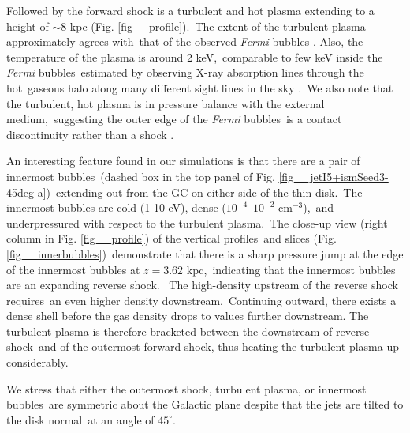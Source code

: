 \documentclass[fleqn,usenatbib,useAMS]{mnras}
\begin{document}
 Followed by the forward shock is a turbulent and hot plasma extending to a height of $\sim 8$ kpc (Fig. \ref{fig__profile}).\
 The extent of the turbulent plasma approximately agrees with\
 that of the observed \textit{Fermi} bubbles \citep{Su2010}.
 Also, the temperature of the plasma is around 2 keV,\
 comparable to few keV inside the \textit{Fermi} bubbles\
 estimated by observing X-ray absorption lines through the hot\
 gaseous halo along many different sight lines in the sky \citep{Miller_2013}.\
 We also note that the turbulent, hot plasma is in pressure balance with the external medium,\
 suggesting the outer edge of the \textit{Fermi} bubbles\
 is a contact discontinuity rather than a shock \citep{Zhang2020}.


 An interesting feature found in our simulations is that there are a pair of innermost bubbles\
 (dashed box in the top panel of Fig. \ref{fig__jetI5+ismSeed3-45deg-a})\
 extending out from the GC on either side of the thin disk.\
 The innermost bubbles are cold (1-10 eV), dense ($10^{-4}$--$10^{-2}$ cm$^{-3}$),\
 and underpressured with respect to the turbulent plasma.\
 The close-up view (right column in Fig. \ref{fig__profile}) of the vertical profiles\
 and slices (Fig. \ref{fig__innerbubbles})\
 demonstrate that there is a sharp pressure jump at the edge of the innermost bubbles at $z=3.62$ kpc,\
 indicating that the innermost bubbles are an expanding reverse shock.\ %
 The high-density upstream of the reverse shock requires\
 an even higher density downstream.\
 Continuing outward, there exists a dense shell before the gas density drops to values further downstream.
 The turbulent plasma is therefore bracketed between the downstream of reverse shock\
 and of the outermost forward shock, thus heating the turbulent plasma up considerably.

 We stress that either the outermost shock, turbulent plasma, or innermost bubbles\
 are symmetric about the Galactic plane despite that the jets are tilted to the disk normal\
 at an angle of $45^{\circ}$.
\end{document}
